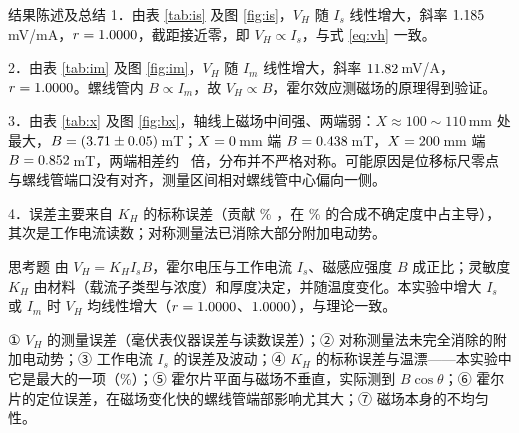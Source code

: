 \documentclass{labreport}
\begin{document}
\begin{labsection}{结果陈述及总结}
1．由表 \ref{tab:is} 及图 \ref{fig:is}，$V_H$ 随 $I_s$ 线性增大，斜率 $\num{1.185}$\,mV/mA，$r=1.0000$，截距接近零，即 $V_H\propto I_s$，与式 \eqref{eq:vh} 一致。\par
2．由表 \ref{tab:im} 及图 \ref{fig:im}，$V_H$ 随 $I_m$ 线性增大，斜率 $\num{11.82}$\,mV/A，$r=1.0000$。螺线管内 $B\propto I_m$，故 $V_H\propto B$，霍尔效应测磁场的原理得到验证。\par
3．由表 \ref{tab:x} 及图 \ref{fig:bx}，轴线上磁场中间强、两端弱：$X\approx100\sim110$\,mm 处最大，$B=(3.71\pm0.05)$\,mT；$X=0$\,mm 端 $B=0.438$\,mT，$X=200$\,mm 端 $B=0.852$\,mT，两端相差约 \EndRatio\ 倍，分布并不严格对称。可能原因是位移标尺零点与螺线管端口没有对齐，测量区间相对螺线管中心偏向一侧。\par
4．误差主要来自 $K_H$ 的标称误差（贡献 \RelKH\% ，在 \RelB\% 的合成不确定度中占主导），其次是工作电流读数；对称测量法已消除大部分附加电动势。
\end{labsection}

\begin{labsection}{思考题}
由 $V_H=K_HI_sB$，霍尔电压与工作电流 $I_s$、磁感应强度 $B$ 成正比；灵敏度 $K_H$ 由材料（载流子类型与浓度）和厚度决定，并随温度变化。本实验中增大 $I_s$ 或 $I_m$ 时 $V_H$ 均线性增大（$r=1.0000$、$1.0000$），与理论一致。

① $V_H$ 的测量误差（毫伏表仪器误差与读数误差）；② 对称测量法未完全消除的附加电动势；③ 工作电流 $I_s$ 的误差及波动；④ $K_H$ 的标称误差与温漂——本实验中它是最大的一项（\RelKH\%）；⑤ 霍尔片平面与磁场不垂直，实际测到 $B\cos\theta$；⑥ 霍尔片的定位误差，在磁场变化快的螺线管端部影响尤其大；⑦ 磁场本身的不均匀性。
\end{labsection}

\labcomment
{}

\end{document}
